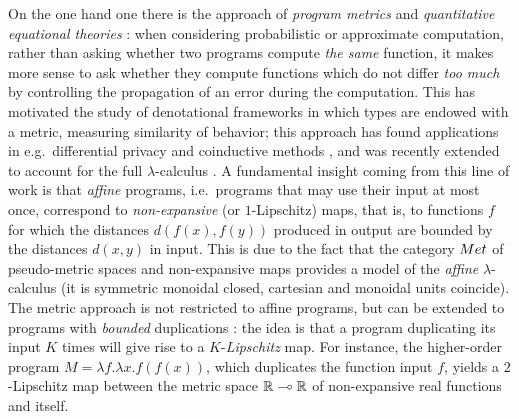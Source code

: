 On the one hand one there is the approach of \emph{program metrics} \cite{Reed2010, Gaboardi2017, Gabo2019} and \emph{quantitative equational theories} \cite{Plotk}: when considering probabilistic or approximate computation, rather than asking whether two programs compute \emph{the same} function, it makes more sense to ask whether they compute functions which do not differ \emph{too much} by controlling the propagation of an error during the computation.
This has motivated the study of denotational frameworks in which types are endowed with a metric, measuring similarity of behavior; this approach has found  applications in e.g.~differential privacy \cite{Reed2010} and coinductive methods \cite{Bonchi2018}, and was recently extended to account for the full $\lambda$-calculus \cite{Geoffroy2020, PistoneLICS, PistoneFSCD2022}.
A fundamental insight coming from this line of work is that \emph{affine} programs, i.e.~programs that may use their input at most once, correspond to \emph{non-expansive} (or $1$-Lipschitz) maps, that is, to functions $f$ for which the distances
$d(f(x),f(y))$ produced in output are bounded by the distances $d(x,y)$ in input. 
This is due to the fact that the category $\Met$ of pseudo-metric spaces and non-expansive maps provides a model of the %
\emph{affine} $\lambda$-calculus (it is symmetric monoidal closed, cartesian and monoidal units coincide). 
The metric approach is not restricted to affine programs, but can be extended to programs with \emph{bounded} duplications \cite{Reed2010, Gaboardi2017}: the idea is that a program duplicating its input $K$ times will give rise to a $K$-\emph{Lipschitz} map.
For instance, the higher-order program $M=\lambda f.\lambda x.f(f(x))$, which duplicates the function input $f$, yields a $2$-Lipschitz map between the metric space $\mathbb{R}\multimap \mathbb{R}$ of non-expansive real functions and itself. %
